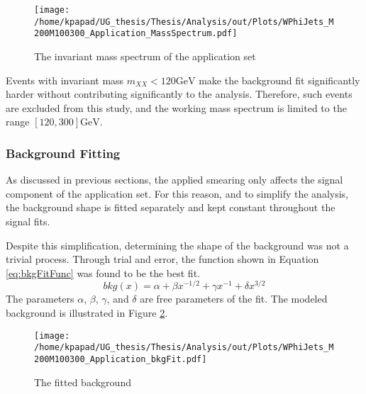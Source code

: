 \begin{figure}[h!]
\centering
\texttt{[image: /home/kpapad/UG\_thesis/Thesis/Analysis/out/Plots/WPhiJets\_M200M100300\_Application\_MassSpectrum.pdf]}
\caption{The invariant mass spectrum of the application set}
\label{fig:AppMass}
\end{figure}

Events with invariant mass \(m_{XX} < 120\text{GeV}\) make the background fit significantly harder without contributing significantly to the analysis. Therefore, such events are excluded from this study, and the working mass spectrum is limited to the range \([120, 300]\text{GeV}\).
\subsubsection{Background Fitting}
\label{sec:org60ef007}
As discussed in previous sections, the applied smearing only affects the signal component of the application set. For this reason, and to simplify the analysis, the background shape is fitted separately and kept constant throughout the signal fits.

Despite this simplification, determining the shape of the background was not a trivial process. Through trial and error, the function shown in Equation \ref{eq:bkgFitFunc} was found to be the best fit.
\begin{equation}
bkg(x) = \alpha + \beta x^{-1/2} + \gamma x^{-1} + \delta x^{3/2}
\label{eq:bkgFitFunc}
\end{equation}
The parameters \(\alpha\), \(\beta\), \(\gamma\), and \(\delta\) are free parameters of the fit. The modeled background is illustrated in Figure \ref{fig:BKGfit}.

\begin{figure}[h!]
\centering
\texttt{[image: /home/kpapad/UG\_thesis/Thesis/Analysis/out/Plots/WPhiJets\_M200M100300\_Application\_bkgFit.pdf]}
\caption{The fitted background}
\label{fig:BKGfit}
\end{figure}
